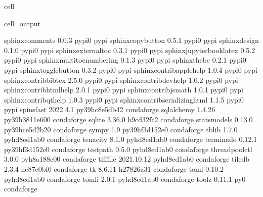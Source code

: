 \documentclass[letterpaper,table,10pt,english]{jupyterBook}
\begin{document}
\begin{sphinxuseclass}{cell}
\begin{sphinxVerbatimOutput}
\begin{sphinxuseclass}{cell_output}
\begin{sphinxVerbatim}[commandchars=\\\{\}]
sphinx\PYGZhy{}comments           0.0.3                    pypi\PYGZus{}0    pypi
sphinx\PYGZhy{}copybutton         0.5.1                    pypi\PYGZus{}0    pypi
sphinx\PYGZhy{}design             0.1.0                    pypi\PYGZus{}0    pypi
sphinx\PYGZhy{}external\PYGZhy{}toc       0.3.1                    pypi\PYGZus{}0    pypi
sphinx\PYGZhy{}jupyterbook\PYGZhy{}latex  0.5.2                    pypi\PYGZus{}0    pypi
sphinx\PYGZhy{}multitoc\PYGZhy{}numbering 0.1.3                    pypi\PYGZus{}0    pypi
sphinx\PYGZhy{}thebe              0.2.1                    pypi\PYGZus{}0    pypi
sphinx\PYGZhy{}togglebutton       0.3.2                    pypi\PYGZus{}0    pypi
sphinxcontrib\PYGZhy{}applehelp   1.0.4                    pypi\PYGZus{}0    pypi
sphinxcontrib\PYGZhy{}bibtex      2.5.0                    pypi\PYGZus{}0    pypi
sphinxcontrib\PYGZhy{}devhelp     1.0.2                    pypi\PYGZus{}0    pypi
sphinxcontrib\PYGZhy{}htmlhelp    2.0.1                    pypi\PYGZus{}0    pypi
sphinxcontrib\PYGZhy{}jsmath      1.0.1                    pypi\PYGZus{}0    pypi
sphinxcontrib\PYGZhy{}qthelp      1.0.3                    pypi\PYGZus{}0    pypi
sphinxcontrib\PYGZhy{}serializinghtml 1.1.5                    pypi\PYGZus{}0    pypi
spinsfast                 2022.4.1         py39hc8e5db4\PYGZus{}2    conda\PYGZhy{}forge
sqlalchemy                1.4.26           py39h3811e60\PYGZus{}0    conda\PYGZhy{}forge
sqlite                    3.36.0               h9cd32fc\PYGZus{}2    conda\PYGZhy{}forge
statsmodels               0.13.0           py39hce5d2b2\PYGZus{}0    conda\PYGZhy{}forge
sympy                     1.9              py39hf3d152e\PYGZus{}0    conda\PYGZhy{}forge
tblib                     1.7.0              pyhd8ed1ab\PYGZus{}0    conda\PYGZhy{}forge
tenacity                  8.1.0              pyhd8ed1ab\PYGZus{}0    conda\PYGZhy{}forge
terminado                 0.12.1           py39hf3d152e\PYGZus{}0    conda\PYGZhy{}forge
testpath                  0.5.0              pyhd8ed1ab\PYGZus{}0    conda\PYGZhy{}forge
threadpoolctl             3.0.0              pyh8a188c0\PYGZus{}0    conda\PYGZhy{}forge
tifffile                  2021.10.12         pyhd8ed1ab\PYGZus{}0    conda\PYGZhy{}forge
tiledb                    2.3.4                he87e0bf\PYGZus{}0    conda\PYGZhy{}forge
tk                        8.6.11               h27826a3\PYGZus{}1    conda\PYGZhy{}forge
toml                      0.10.2             pyhd8ed1ab\PYGZus{}0    conda\PYGZhy{}forge
tomli                     2.0.1              pyhd8ed1ab\PYGZus{}0    conda\PYGZhy{}forge
toolz                     0.11.1                     py\PYGZus{}0    conda\PYGZhy{}forge

\end{sphinxVerbatim}
\end{sphinxuseclass}
\end{sphinxVerbatimOutput}
\end{sphinxuseclass}
\end{document}
